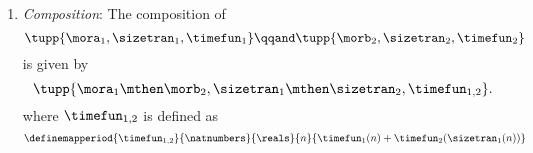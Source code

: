 \begin{definition}
\begin{enumerate}
        \item \emph{Composition}: The composition of
              \begin{equation}
                  \tupp{\mora_1, \sizetran_1,  \timefun_1  }
                  \qqand
                  \tupp{\morb_2, \sizetran_2,  \timefun_2  }
              \end{equation}
              is given by
              \begin{equation}
                  \tupp{
                      \mora_1 \mthen \morb_2,
                      \sizetran_1 \mthen \sizetran_2,
                      \timefun_{1,2}
                  }.
              \end{equation}
              where $\timefun_{1,2}$ is defined as
              \begin{equation}
                  \label{eq:timefun-composition}
                  \definemapperiod{
                      \timefun_{1,2}
                  }{
                      \natnumbers
                  }{
                      \reals
                  }{
                      n
                  }{
                      \timefun_1(n) + \timefun_2(\sizetran_1(n))
                  }
              \end{equation}
    \end{enumerate}
\end{definition}

